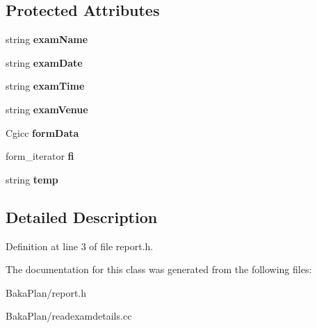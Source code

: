 \subsection*{Protected Attributes}
\begin{DoxyCompactItemize}
\item 
\hypertarget{classReadExamDetails_a815896608a58b449b451305306dd8d38}{string {\bfseries exam\-Name}}\label{classReadExamDetails_a815896608a58b449b451305306dd8d38}

\item 
\hypertarget{classReadExamDetails_a66cd09674039e76f3137d08fea2d9ef2}{string {\bfseries exam\-Date}}\label{classReadExamDetails_a66cd09674039e76f3137d08fea2d9ef2}

\item 
\hypertarget{classReadExamDetails_a86b8b41b014ce26c12113b49137520ef}{string {\bfseries exam\-Time}}\label{classReadExamDetails_a86b8b41b014ce26c12113b49137520ef}

\item 
\hypertarget{classReadExamDetails_a0ef2238b4dd4e930b278658fcf184b73}{string {\bfseries exam\-Venue}}\label{classReadExamDetails_a0ef2238b4dd4e930b278658fcf184b73}

\item 
\hypertarget{classReadExamDetails_a7dff5b6a855ccacaf477b3dd79850c91}{Cgicc {\bfseries form\-Data}}\label{classReadExamDetails_a7dff5b6a855ccacaf477b3dd79850c91}

\item 
\hypertarget{classReadExamDetails_a2d108fa7b89860260891d1fc13329153}{form\-\_\-iterator {\bfseries fi}}\label{classReadExamDetails_a2d108fa7b89860260891d1fc13329153}

\item 
\hypertarget{classReadExamDetails_a77167675e8c30ba10941b7e36866e08e}{string {\bfseries temp}}\label{classReadExamDetails_a77167675e8c30ba10941b7e36866e08e}

\end{DoxyCompactItemize}


\subsection{Detailed Description}


Definition at line 3 of file report.\-h.



The documentation for this class was generated from the following files\-:\begin{DoxyCompactItemize}
\item 
Baka\-Plan/report.\-h\item 
Baka\-Plan/readexamdetails.\-cc\end{DoxyCompactItemize}
